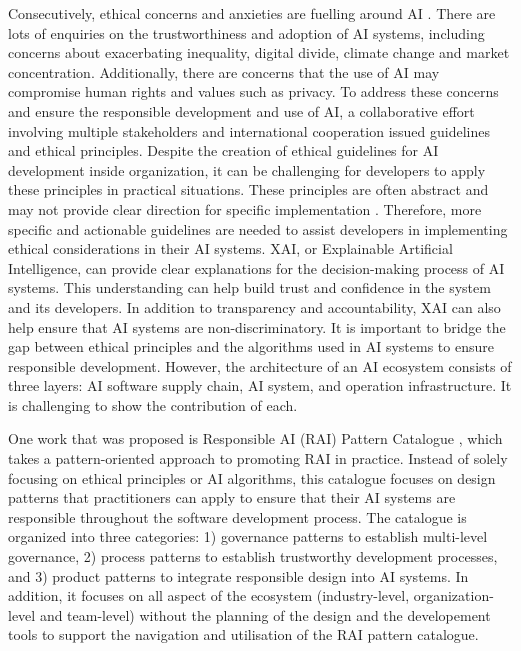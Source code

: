 \documentclass[conference]{IEEEtran}
\begin{document}
Consecutively, ethical concerns and anxieties are fuelling around AI \cite{DBLP}. There are lots of enquiries on the trustworthiness and adoption of AI systems, including concerns about exacerbating inequality, digital divide, climate change and market concentration. Additionally, there are concerns that the use of AI may compromise human rights and values such as privacy. To address these concerns and ensure the responsible development and use of AI, a collaborative effort involving multiple stakeholders and international cooperation issued guidelines and ethical principles. Despite the creation of ethical guidelines for AI development inside organization, it can be challenging for developers to apply these principles in practical situations. These principles are often abstract and may not provide clear direction for specific implementation \cite{abs-2111-09478}. Therefore, more specific and actionable guidelines are needed to assist developers in implementing ethical considerations in their AI systems. XAI, or Explainable Artificial Intelligence, can provide clear explanations for the decision-making process of AI systems. This understanding can help build trust and confidence in the system and its developers. In addition to transparency and accountability, XAI can also help ensure that AI systems are non-discriminatory. It is important to bridge the gap between ethical principles and the algorithms used in AI systems to ensure responsible development. However, the architecture of an AI ecosystem consists of three layers: AI software supply chain, AI system, and operation infrastructure. It is challenging to show the contribution of each.

One work that was proposed is Responsible AI (RAI) Pattern Catalogue \cite{catalogue}, which takes a pattern-oriented approach to promoting RAI in practice. Instead of solely focusing on ethical principles or AI algorithms, this catalogue focuses on design patterns that practitioners can apply to ensure that their AI systems are responsible throughout the software development process. The catalogue is organized into three categories: 1) governance patterns to establish multi-level governance, 2) process patterns to establish trustworthy development processes, and 3) product patterns to integrate responsible design into AI systems. In addition, it focuses on all aspect of the ecosystem (industry-level, organization-level and team-level) without the planning of the design and the developement tools to support the navigation and utilisation of the RAI pattern catalogue.
\end{document}
